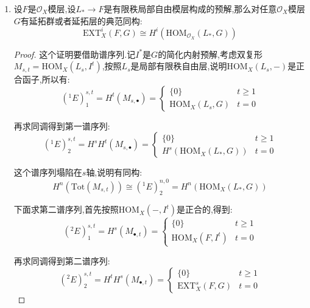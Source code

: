 \begin{enumerate}
	不平凡的是如果$0\to F_1\to F_2\to F_3\to0$是$\mathscr{O}_X$模层的短正合列,仍有延拓群和延拓层的如下长正合列(因为按理说$\mathrm{Ext}_X^i(-,-)$不是双函子的导出函子列,所以本不该诱导这个位置的长正合列).
	$$\xymatrix{\cdots\ar[r]&\mathrm{Ext}^i_X(F_3,G)\ar[r]&\mathrm{Ext}^i_X(F_2,G)\ar[r]&\mathrm{Ext}^i_X(F_1,G)\ar[r]&\mathrm{Ext}^{i+1}_X(F_1,G)\ar[r]&\cdots}$$
	\begin{proof}
		
		取$G$的内射预解$G\to I^*$,那么有如下复形的短正合列,它取长正合列得到结论.
		$$\xymatrix{0\ar[r]&\mathrm{Hom}_X(F_3,I^*)\ar[r]&\mathrm{Hom}_X(F_2,I^*)\ar[r]&\mathrm{Hom}_X(F_1,I^*)\ar[r]&0}$$
	\end{proof}
	\item 设$F$是$\mathscr{O}_X$模层,设$L_*\to F$是有限秩局部自由模层构成的预解,那么对任意$\mathscr{O}_X$模层$G$有延拓群或者延拓层的典范同构:
	$$\mathrm{EXT}^i_X(F,G)\cong H^i(\mathrm{HOM}_{\mathscr{O}_X}(L_*,G))$$
	\begin{proof}
		
		这个证明要借助谱序列.记$I^*$是$G$的简化内射预解,考虑双复形$M_{s,t}=\mathrm{HOM}_X(L_s,I^t)$,按照$L_s$是局部有限秩自由层,说明$\mathrm{HOM}_X(L_s,-)$是正合函子,所以有:
		$$(^1E)_1^{s,t}=H^t(M_{s,\bullet})=\left\{\begin{array}{cc}\{0\}&t\ge1\\\mathrm{HOM}_X(L_s,G)&t=0\end{array}\right.$$
		
		再求同调得到第一谱序列:
		$$(^1E)_2^{s,t}=H^sH^t(M_{s,\bullet})=\left\{\begin{array}{cc}\{0\}&t\ge1\\H^s(\mathrm{HOM}_X(L_*,G))&t=0\end{array}\right.$$
		
		这个谱序列塌陷在$s$轴,说明有同构:
		$$H^n(\mathrm{Tot}(M_{s,t}))\cong(^1E)_2^{n,0}=H^n(\mathrm{HOM}_X(L_*,G))$$
		
		下面求第二谱序列,首先按照$\mathrm{HOM}_X(-,I^t)$是正合的,得到:
		$$(^2E)_1^{s,t}=H^s(M_{\bullet,t})=\left\{\begin{array}{cc}\{0\}&t\ge1\\\mathrm{HOM}_X(F,I^t)&t=0\end{array}\right.$$
		
		再求同调得到第二谱序列:
		$$(^2E)_2^{s,t}=H^tH^s(M_{\bullet,t})=\left\{\begin{array}{cc}\{0\}&t\ge1\\\mathrm{EXT}_X^s(F,G)&t=0\end{array}\right.$$
		

\end{proof}
\end{enumerate}
